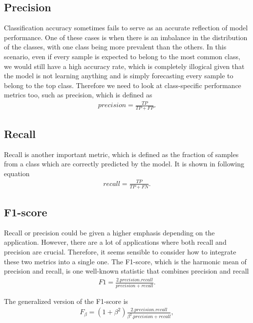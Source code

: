 \subsection{Precision}
\hspace{0.5cm}Classification accuracy sometimes fails to serve as an accurate reflection of model performance. One of these cases is when there is an imbalance in the distribution of the classes, with one class being more prevalent than the others. In this scenario, even if every sample is expected to belong to the most common class, we would still have a high accuracy rate, which is completely illogical given that the model is not learning anything and is simply forecasting every sample to belong to the top class. Therefore we need to look at class-specific performance metrics too, such as precision, which is defined as
\begin{align*}
	precision = \frac{TP}{TP + FP}.
\end{align*}

\subsection{Recall}
\hspace{0.5cm}Recall is another important metric, which is defined as the fraction of samples from a class which are correctly predicted by the model. It is shown in following equation
\begin{align*}
	recall = \frac{TP}{TP + FN}.
\end{align*}

\subsection{F1-score}
\hspace{0.5cm}Recall or precision could be given a higher emphasis depending on the application. However, there are a lot of applications where both recall and precision are crucial. Therefore, it seems sensible to consider how to integrate these two metrics into a single one. The F1-score, which is the harmonic mean of precision and recall, is one well-known statistic that combines precision and recall
\begin{align*}
	F1 = \frac{2.precision.recall}{precision + recall}.
\end{align*}

The generalized version of the F1-score is
\begin{align*}
	F_\beta = \left(1 + \beta^2 \right)\frac{2.precision.recall}{\beta^2.precision + recall},
\end{align*}

